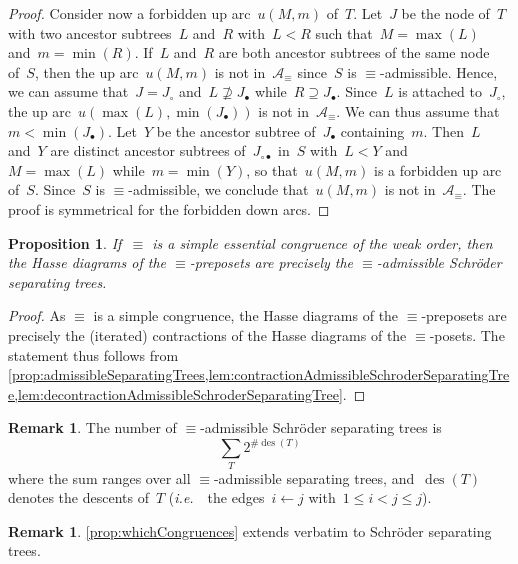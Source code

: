 \documentclass{amsart}
\newtheorem{proposition}[theorem]{Proposition}
\theoremstyle{definition}
\newtheorem{remark}[theorem]{Remark}
\DeclareMathOperator{\des}{des} %
\newcommand{\ie}{\textit{i.e.}~} %
\newcommand{\arcs}{{\mathcal{A}}} %
\begin{document}
\begin{proof}
Consider now a forbidden up arc~$u(M,m)$ of~$T$.
Let~$J$ be the node of~$T$ with two ancestor subtrees~$L$ and~$R$ with~$L < R$ such that~$M = \max(L)$ and~$m = \min(R)$.
If~$L$ and~$R$ are both ancestor subtrees of the same node of~$S$, then the up arc~$u(M,m)$ is not in~$\arcs_\equiv$ since~$S$ is \mbox{$\equiv$-admissible}.
Hence, we can assume that~$J = J_\circ$ and~$L \not\supseteq J_\bullet$ while~$R \supseteq J_\bullet$.
Since~$L$ is attached to~$J_\circ$, the up arc~$u(\max(L), \min(J_\bullet))$ is not in~$\arcs_\equiv$.
We can thus assume that~$m < \min(J_\bullet)$.
Let~$Y$ be the ancestor subtree of~$J_\bullet$ containing~$m$.
Then~$L$ and~$Y$ are distinct ancestor subtrees of~$J_{\circ\bullet}$ in~$S$ with~$L < Y$ and~$M = \max(L)$ while~$m = \min(Y)$, so that~$u(M,m)$ is a forbidden up arc of~$S$.
Since~$S$ is $\equiv$-admissible, we conclude that~$u(M,m)$ is not in~$\arcs_\equiv$.
The proof is symmetrical for the forbidden down arcs.
\end{proof}


\begin{proposition}
\label{prop:admissibleSchroderSeparatingTrees}
If~$\equiv$ is a simple essential congruence of the weak order, then the Hasse diagrams of the $\equiv$-preposets are precisely the $\equiv$-admissible Schröder separating trees.
\end{proposition}

\begin{proof}
As $\equiv$ is a simple congruence, the Hasse diagrams of the $\equiv$-preposets are precisely the (iterated) contractions of the Hasse diagrams of the $\equiv$-posets.
The statement thus follows from \cref{prop:admissibleSeparatingTrees,lem:contractionAdmissibleSchroderSeparatingTree,lem:decontractionAdmissibleSchroderSeparatingTree}.
\end{proof}

\begin{remark}
The number of $\equiv$-admissible Schröder separating trees is
\[
\sum_T 2^{\#\des(T)}
\]
where the sum ranges over all $\equiv$-admissible separating trees, and~$\des(T)$ denotes the descents of~$T$ (\ie~the edges~$i \leftarrow j$ with~$1 \le i < j \le j$).
\end{remark}

\begin{remark}
\cref{prop:whichCongruences} extends verbatim to Schröder separating trees.
\end{remark}
\end{document}
